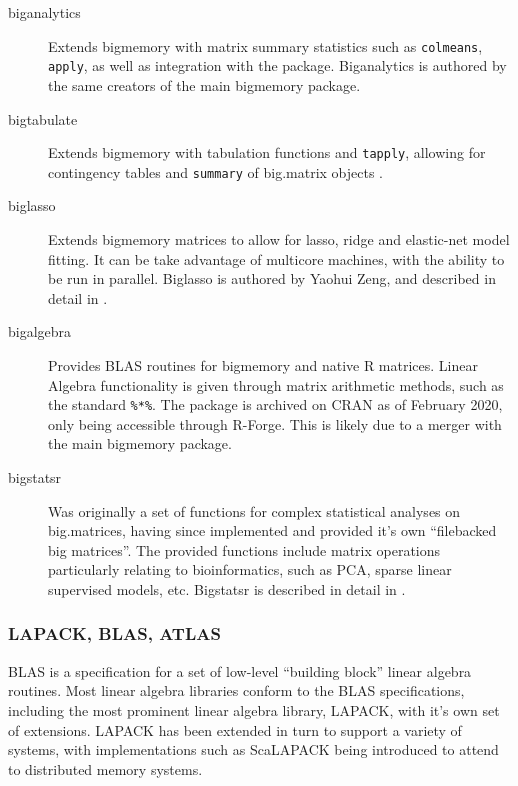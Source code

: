 \begin{description}

    \item[biganalytics]
        Extends bigmemory with matrix summary statistics such as
        \texttt{colmeans}, \texttt{apply}, as well as integration with the 
        package\cite{emerson16}. Biganalytics is authored by the same creators
        of the main bigmemory package.
    \item[bigtabulate]
        Extends bigmemory with tabulation functions and \texttt{tapply},
        allowing for contingency tables and \texttt{summary} of big.matrix
        objects \cite{kane16}.
    \item[biglasso]
        Extends bigmemory matrices to allow for lasso, ridge and elastic-net
        model fitting. It can be take advantage of multicore machines, with the
        ability to be run in parallel. Biglasso is authored by Yaohui Zeng, and
        described in detail in \cite{zeng2017biglasso}.
    \item[bigalgebra]
        Provides BLAS routines for bigmemory and native R matrices. Linear
        Algebra functionality is given through matrix arithmetic methods, such
        as the standard \texttt{\%*\%}. The package is archived
        on CRAN as of February 2020, only being accessible through R-Forge. This
        is likely due to a merger with the main bigmemory package.
    \item[bigstatsr]
        Was originally a set of functions for complex statistical analyses on
        big.matrices, having since implemented and provided it's own
        ``filebacked big matrices''\cite{prive2018efficient}. The provided
        functions include matrix operations particularly relating to
        bioinformatics, such as PCA, sparse linear supervised models, etc.
        Bigstatsr is described in detail in \cite{prive2018efficient}.
\end{description}

\hypertarget{sec:blas-lapack}{%
    \subsubsection{LAPACK, BLAS, ATLAS}\label{sec:blas-lapack}}

BLAS is a specification for a set of low-level ``building block'' linear
algebra routines\cite{lawson1979basic}. Most linear algebra libraries
conform to the BLAS specifications, including the most prominent linear
algebra library, LAPACK, with it's own set of
extensions\cite{demmel1989lapack}. LAPACK has been extended in turn to
support a variety of systems, with implementations such as ScaLAPACK
being introduced to attend to distributed memory
systems\cite{choi1992scalapack}.


